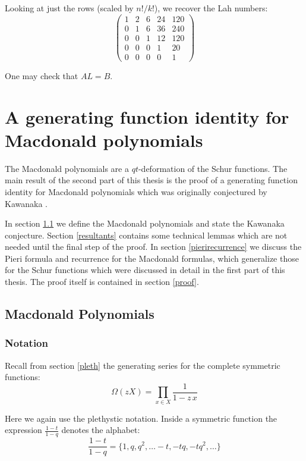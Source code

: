 \documentclass[12pt,dvips]{amsart}
\begin{document}
\par\bigskip
Looking at just the rows (scaled by $n! / k!$), we recover the Lah numbers:
$$ \left(
\begin{array}{rrrrr}
 1 & 2 & 6 & 24 & 120 \\
 0 & 1 & 6 & 36 & 240 \\
 0 & 0 & 1 & 12 & 120 \\
 0 & 0 & 0 & 1 & 20 \\
 0 & 0 & 0 & 0 & 1
\end{array}
\right) $$

\par\bigskip
One may check that $AL = B$.
\newpage
\section{A generating function identity for Macdonald polynomials}



The Macdonald polynomials are a $qt$-deformation of the Schur functions. The main result of the second part of this thesis is the proof of a generating function identity for Macdonald polynomials which was originally conjectured by Kawanaka \cite{KAWANAKA}. 

In section \ref{intro} we define the Macdonald polynomials and state the Kawanaka conjecture. Section \ref{resultants} contains some technical lemmas which are not needed until the final step of the proof. In section \ref{pierirecurrence} we discuss the Pieri formula and recurrence for the Macdonald formulas, which generalize those for the Schur functions which were discussed in detail in the first part of this thesis. The proof itself is contained in section \ref{proof}.

\subsection{Macdonald Polynomials}\label{intro}
\subsubsection{Notation}
Recall from section \ref{pleth} the generating series for the complete symmetric functions:
\[
\Omega(zX)=\prod_{x\in X}\frac{1}{1-z\,x}
\]


Here we again use the plethystic notation. 
Inside a symmetric function the expression $\frac{1-t}{1-q}$ denotes the alphabet:
$$ \frac{1 - t}{1 - q} = \{1, q, q^2, \ldots -t, -tq, -tq^2, \ldots \} $$	
\end{document}

